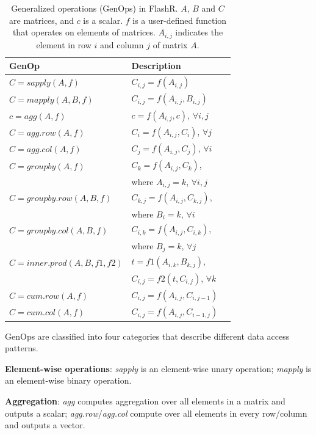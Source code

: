 \begin{table}
\begin{center}
\caption{Generalized operations (GenOps) in FlashR. $A$, $B$ and $C$ are
	matrices, and $c$ is a scalar. $f$ is a user-defined function that
	operates on elements of matrices. $A_{i,j}$ indicates the element
	in row $i$ and column $j$ of matrix $A$.}
\vspace{-10pt}
\footnotesize
\begin{tabular}{|l|l|l|}
\hline
GenOp & Description \\
\hline
$C=sapply(A, f)$ & $C_{i,j}=f(A_{i,j})$ \\
$C=mapply(A, B, f)$ & $C_{i,j}=f(A_{i,j}, B_{i,j})$ \\
\hline
$c=agg(A, f)$ & $c=f(A_{i,j}, c)$, $\forall i, j$ \\
$C=agg.row(A, f)$ & $C_i=f(A_{i,j}, C_i)$, $\forall j$ \\
$C=agg.col(A, f)$ & $C_j=f(A_{i,j}, C_j)$, $\forall i$ \\
\hline
$C=groupby(A, f)$ & $C_{k}=f(A_{i,j}, C_{k})$,\\ & where $A_{i, j}=k$, $\forall i,j$ \\
$C=groupby.row(A, B, f)$ & $C_{k,j}=f(A_{i,j}, C_{k,j})$,\\ & where $B_i=k$, $\forall i$ \\
$C=groupby.col(A, B, f)$ & $C_{i,k}=f(A_{i,j}, C_{i,k})$,\\ & where $B_j=k$, $\forall j$ \\
\hline
$C=inner.prod(A, B, f1, f2)$ & $t=f1(A_{i,k}, B_{k,j})$,
\\ & $C_{i,j}=f2(t, C_{i,j})$, $\forall k$ \\
\hline
$C=cum.row(A, f)$ & $C_{i,j}=f(A_{i,j}, C_{i,j-1})$ \\
$C=cum.col(A, f)$ & $C_{i,j}=f(A_{i,j}, C_{i-1,j})$ \\
\hline
\end{tabular}
\normalsize
\label{tbl:genops}
\vspace{-10pt}
\end{center}
\end{table}

GenOps are classified into four categories that describe different data access
patterns.

\noindent \textbf{Element-wise operations}:
\textit{sapply} is an element-wise unary operation; \textit{mapply}
is an element-wise binary operation.

\noindent \textbf{Aggregation}: \textit{agg} computes aggregation over
all elements in a matrix and outputs a scalar; \textit{agg.row}/\textit{agg.col}
compute over all elements in every row/column and outputs a vector.

